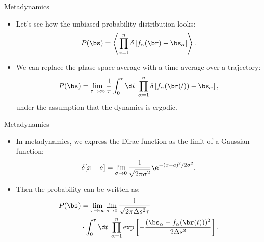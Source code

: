 \documentclass[10pt]{beamer}
\begin{document}
\begin{frame}{Metadynamics}
\begin{itemize}
\setlength\itemsep{1em}
  \item Let's see how the unbiased probability distribution looks:
  \begin{equation}
    P(\bs) = \left< \prod_{\alpha=1}^n \delta\left[ f_\alpha(\br) - \bs_\alpha \right] \right>.
  \end{equation}
  \item We can replace the phase space average with a time average over a trajectory:
  \begin{equation}
    P(\bs) = \lim_{\tau\rightarrow\infty} \frac{1}{\tau} \int_0^\tau \d t\; \prod_{\alpha=1}^n \delta\left[ f_\alpha(\br(t)) - \bs_\alpha \right],
  \end{equation}
  under the assumption that the dynamics is ergodic.
\end{itemize}
\end{frame}

\begin{frame}{Metadynamics}
\begin{itemize}
\setlength\itemsep{1em}
  \item In metadynamics, we express the Dirac function as the limit of a Gaussian function:
  \begin{equation}
    \delta[x-a] = \lim_{\sigma\rightarrow 0} \frac{1}{\sqrt{2\pi\sigma^2}} \e^{-(x-a)^2/2\sigma^2}.
  \end{equation}
  \item Then the probability can be written as:
  \begin{align}
    P(\bs) &= \lim_{\tau\rightarrow\infty}\lim_{s\rightarrow 0} \frac{1}{\sqrt{2\pi\Delta s^2}\tau} \nonumber\\
           &\cdot \int_0^\tau \d t\; \prod_{\alpha=1}^n \exp\left[ -\frac{(\bs_\alpha - f_\alpha(\br(t)))^2}{2\Delta s^2} \right].
  \label{eq:metap}
  \end{align}
\end{itemize}
\end{frame}
\end{document}
